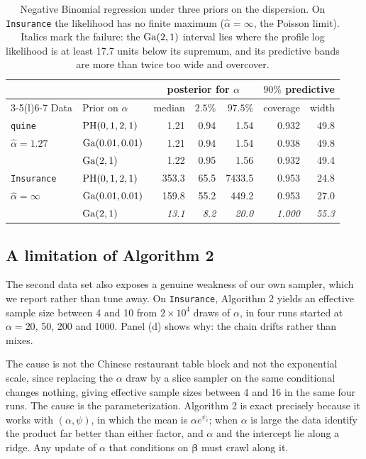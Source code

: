 \begin{table}[htbp]
\centering\small
\setlength{\tabcolsep}{3.5pt}
\begin{tabular}{@{}llrrrrr@{}}
\toprule
 & & \multicolumn{3}{c}{posterior for $\alpha$} & \multicolumn{2}{c}{$90\%$ predictive}\\
\cmidrule(lr){3-5}\cmidrule(l){6-7}
Data & Prior on $\alpha$ & median & $2.5\%$ & $97.5\%$ & coverage & width\\
\midrule
\texttt{quine} & $\mathrm{PH}(0,1,2,1)$ & 1.21 & 0.94 & 1.54 & 0.932 & 49.8\\
$\hat\alpha=1.27$ & $\mathrm{Ga}(0.01,0.01)$ & 1.21 & 0.94 & 1.54 & 0.938 & 49.8\\
 & $\mathrm{Ga}(2,1)$ & 1.22 & 0.95 & 1.56 & 0.932 & 49.4\\
\midrule
\texttt{Insurance} & $\mathrm{PH}(0,1,2,1)$ & 353.3 & 65.5 & 7433.5 & 0.953 & 24.8\\
$\hat\alpha=\infty$ & $\mathrm{Ga}(0.01,0.01)$ & 159.8 & 55.2 & 449.2 & 0.953 & 27.0\\
 & $\mathrm{Ga}(2,1)$ & \emph{13.1} & \emph{8.2} & \emph{20.0} & \emph{1.000} & \emph{55.3}\\
\bottomrule
\end{tabular}
\caption{Negative Binomial regression under three priors on the dispersion. On \texttt{Insurance} the likelihood has no finite maximum ($\hat\alpha=\infty$, the Poisson limit). Italics mark the failure: the $\mathrm{Ga}(2,1)$ interval lies where the profile log likelihood is at least 17.7 units below its supremum, and its predictive bands are more than twice too wide and overcover.}\label{rc:tab:nbreg}
\end{table}

\subsection{A limitation of Algorithm 2}\label{rc:sec:nblimit}

The second data set also exposes a genuine weakness of our own sampler, which we report rather than tune away. On \texttt{Insurance}, Algorithm 2 yields an effective sample size between 4 and 10 from $2\times10^4$ draws of $\alpha$, in four runs started at $\alpha=20$, 50, 200 and 1000. Panel (d) shows why: the chain drifts rather than mixes.

The cause is not the Chinese restaurant table block and not the exponential scale, since replacing the $\alpha$ draw by a slice sampler on the same conditional changes nothing, giving effective sample sizes between 4 and 16 in the same four runs. The cause is the parameterization. Algorithm 2 is exact precisely because it works with $(\alpha,\psi)$, in which the mean is $\alpha e^{\psi_i}$; when $\alpha$ is large the data identify the product far better than either factor, and $\alpha$ and the intercept lie along a ridge. Any update of $\alpha$ that conditions on $\bm\beta$ must crawl along it.

